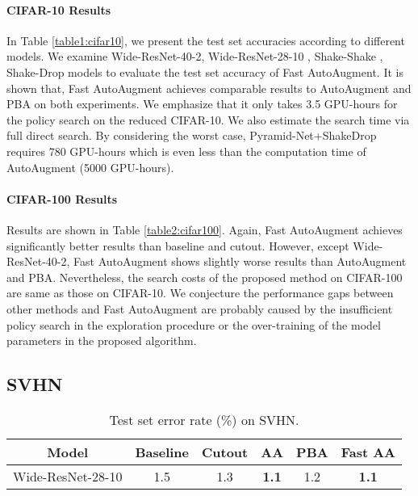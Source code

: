 \documentclass{article}
\begin{document}
\paragraph{CIFAR-10 Results}

In Table \ref{table1:cifar10}, we present the test set accuracies according to different models. We examine Wide-ResNet-40-2, Wide-ResNet-28-10 \cite{zagoruyko2016wide}, Shake-Shake \cite{gastaldi2017shake}, Shake-Drop \cite{yamada2018shakedrop} models to evaluate the test set accuracy of Fast AutoAugment. It is shown that, Fast AutoAugment achieves comparable results to AutoAugment and PBA on both experiments. We emphasize that it only takes 3.5 GPU-hours for the policy search on the reduced CIFAR-10. We also estimate the search time via full direct search. By considering the worst case, Pyramid-Net+ShakeDrop requires 780 GPU-hours which is even less than the computation time of AutoAugment (5000 GPU-hours).  

\paragraph{CIFAR-100 Results}

Results are shown in Table \ref{table2:cifar100}. Again, Fast AutoAugment achieves significantly better results than baseline and cutout. However, except Wide-ResNet-40-2, Fast AutoAugment shows slightly worse results than AutoAugment and PBA. Nevertheless, the search costs of the proposed method on CIFAR-100 are same as those on CIFAR-10. We conjecture the performance gaps between other methods and Fast AutoAugment are probably caused by the insufficient policy search in the exploration procedure or the over-training of the model parameters in the proposed algorithm. 



\subsection{SVHN}

\begin{table*}[t!] \center
\begin{tabular}{c | c c c c | c}
\toprule
Model & Baseline & Cutout \cite{devries2017cutout} & AA \cite{cubuk2018autoaugment} & PBA \cite{ho2019pba} & Fast AA
\tabularnewline
\midrule
Wide-ResNet-28-10 & 1.5 & 1.3 & \textbf{1.1} & 1.2 & \textbf{1.1}
\tabularnewline
\bottomrule
\end{tabular}
\caption{Test set error rate (\%) on SVHN.}
\label{table3:svhn}
\end{table*}
\end{document}
